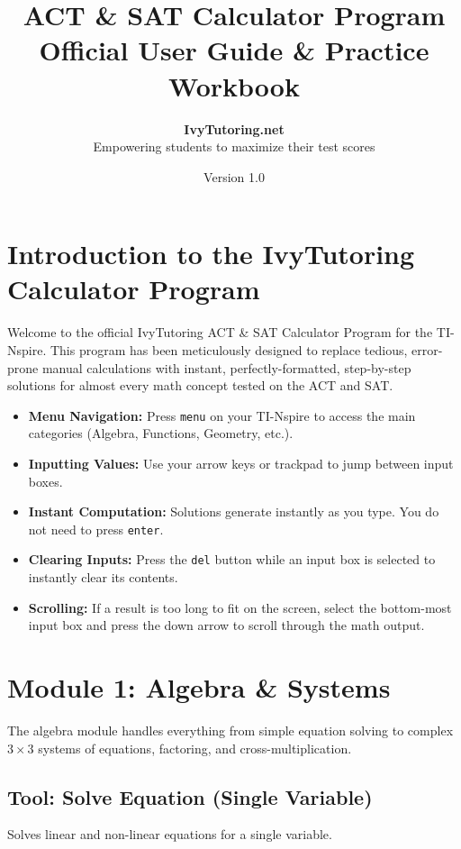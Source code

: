 \documentclass[11pt,a4paper]{article}
\title{\vspace{-2cm}\color{ivygreen}\Huge \textbf{ACT \& SAT Calculator Program}\\ \Large \textbf{Official User Guide \& Practice Workbook}}
\author{\textbf{IvyTutoring.net}\\ Empowering students to maximize their test scores}
\date{Version 1.0}
\begin{document}
\maketitle

\tableofcontents
\newpage

\section{Introduction to the IvyTutoring Calculator Program}
Welcome to the official IvyTutoring ACT \& SAT Calculator Program for the TI-Nspire. This program has been meticulously designed to replace tedious, error-prone manual calculations with instant, perfectly-formatted, step-by-step solutions for almost every math concept tested on the ACT and SAT.

\begin{tcolorbox}[colback=ivygreen!5!white,colframe=ivygreen,title=General Tips for Navigation]
\begin{itemize}
    \item \textbf{Menu Navigation:} Press \texttt{menu} on your TI-Nspire to access the main categories (Algebra, Functions, Geometry, etc.).
    \item \textbf{Inputting Values:} Use your arrow keys or trackpad to jump between input boxes.
    \item \textbf{Instant Computation:} Solutions generate instantly as you type. You do not need to press \texttt{enter}.
    \item \textbf{Clearing Inputs:} Press the \texttt{del} button while an input box is selected to instantly clear its contents.
    \item \textbf{Scrolling:} If a result is too long to fit on the screen, select the bottom-most input box and press the down arrow to scroll through the math output.
\end{itemize}
\end{tcolorbox}

\newpage

\section{Module 1: Algebra \& Systems}
The algebra module handles everything from simple equation solving to complex $3\times3$ systems of equations, factoring, and cross-multiplication.

\subsection{Tool: Solve Equation (Single Variable)}
Solves linear and non-linear equations for a single variable.
\end{document}
